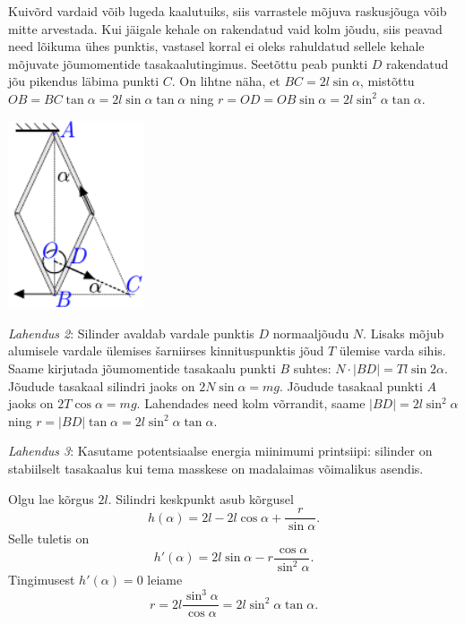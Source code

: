 \documentclass[10pt]{article}
\begin{document}
Kuivõrd vardaid võib lugeda kaalutuiks, siis varrastele mõjuva raskusjõuga võib mitte arvestada. Kui jäigale kehale on rakendatud vaid kolm jõudu, siis peavad need lõikuma ühes punktis, vastasel korral ei oleks rahuldatud sellele kehale mõjuvate  jõumomentide tasakaalutingimus. Seetõttu peab punkti $D$ rakendatud jõu pikendus läbima punkti $C$. On lihtne näha, et $BC=2l\sin\alpha$, mistõttu $OB=BC\tan\alpha=2l\sin\alpha\tan\alpha$ ning $r=OD=OB\sin\alpha=2l\sin^2\alpha\tan\alpha$.
\begin{center}
  \includegraphics[width=0.3\textwidth]{2024-v3g-07-yl.pdf}
\end{center}

\textit{Lahendus 2}: Silinder avaldab vardale punktis $D$ normaaljõudu $N$. Lisaks mõjub alumisele vardale ülemises šarniirses kinnituspunktis jõud $T$ ülemise varda sihis. Saame kirjutada jõumomentide tasakaalu punkti $B$ suhtes: $N \cdot |BD| =Tl\sin2\alpha$. Jõudude tasakaal silindri jaoks on $2N\sin\alpha=mg$. Jõudude tasakaal punkti $A$ jaoks on $2T\cos\alpha=mg$. Lahendades need kolm võrrandit, saame $|BD|=2l\sin^2\alpha$ ning $r=|BD|\tan\alpha=2l\sin^2\alpha \tan\alpha$.

\textit{Lahendus 3}: Kasutame potentsiaalse energia miinimumi printsiipi: silinder on stabiilselt tasakaalus kui tema masskese on madalaimas võimalikus asendis.

Olgu lae kõrgus $2l$. Silindri keskpunkt asub kõrgusel
\[
  h(\alpha)=2l-2l\cos\alpha + \frac{r}{\sin\alpha}.
\]
Selle tuletis on
\[
  h'(\alpha)=2l\sin\alpha - r\frac{\cos\alpha}{\sin^2\alpha}.
\]
Tingimusest $h'(\alpha)=0$ leiame
\[
  r=2l\frac{\sin^3\alpha}{\cos\alpha}=2l\sin^2\alpha \tan\alpha.
\]
\probend
\bigskip

\end{document}
